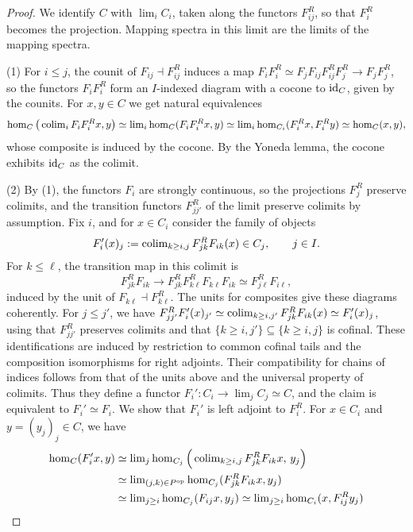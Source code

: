 	\begin{proof}
		We identify $C$ with $\lim_i C_i$, taken along the functors $F_{ij}^R$, so that $F_i^R$ becomes the projection. Mapping spectra in this limit are the limits of the mapping spectra.

		(1) For $i \leq j$, the counit of $F_{ij} \dashv F_{ij}^R$ induces a map $F_iF_i^R \simeq F_jF_{ij}F_{ij}^RF_j^R \to F_jF_j^R$, so the functors $F_iF_i^R$ form an $I$-indexed diagram with a cocone to $\operatorname{id}_C$, given by the counits. For $x,y \in C$ we get natural equivalences
		\[
			\hom_C\big(\operatorname{colim}_i F_iF_i^Rx,y\big) \simeq \operatorname{lim}_i \hom_C(F_iF_i^Rx,y) \simeq \operatorname{lim}_i \hom_{C_i}(F_i^Rx,F_i^Ry) \simeq \hom_C(x,y),
		\]
		whose composite is induced by the cocone. By the Yoneda lemma, the cocone exhibits $\operatorname{id}_C$ as the colimit.

		(2) By (1), the functors $F_i$ are strongly continuous, so the projections $F_j^R$ preserve colimits, and the transition functors $F_{jj'}^R$ of the limit preserve colimits by assumption. Fix $i$, and for $x \in C_i$ consider the family of objects
		\[
			F_i'(x)_j := \operatorname{colim}_{k \geq i,j} F_{jk}^RF_{ik}(x) \in C_j, \qquad j \in I.
		\]
		For $k \leq \ell$, the transition map in this colimit is
		\[
			F_{jk}^RF_{ik} \longrightarrow F_{jk}^RF_{k\ell}^RF_{k\ell}F_{ik} \simeq F_{j\ell}^RF_{i\ell},
		\]
		induced by the unit of $F_{k\ell} \dashv F_{k\ell}^R$. The units for composites give these diagrams coherently. For $j \leq j'$, we have $F_{jj'}^R F_i'(x)_{j'} \simeq \operatorname{colim}_{k \geq i,j'} F_{jk}^RF_{ik}(x) \simeq F_i'(x)_j$, using that $F_{jj'}^R$ preserves colimits and that $\{k \geq i,j'\} \subseteq \{k \geq i,j\}$ is cofinal. These identifications are induced by restriction to common cofinal tails and the composition isomorphisms for right adjoints. Their compatibility for chains of indices follows from that of the units above and the universal property of colimits. Thus they define a functor $F_i'\colon C_i \to \lim_j C_j \simeq C$, and the claim is equivalent to $F_i' \simeq F_i$. We show that $F_i'$ is left adjoint to $F_i^R$. For $x \in C_i$ and $y = (y_j)_j \in C$, we have
		\begin{align*}
			\hom_C(F_i'x,y) &\simeq \lim_j \hom_{C_j}\Big(\colim_{k \geq i,j} F_{jk}^RF_{ik}x,\, y_j\Big) \\
			&\simeq \lim_{(j,k) \in P\catop} \hom_{C_j}(F_{jk}^RF_{ik}x,y_j) \\
			&\simeq \lim_{j \geq i} \hom_{C_j}(F_{ij}x,y_j) \simeq \lim_{j \geq i} \hom_{C_i}(x,F_{ij}^Ry_j) \\

\end{align*}
\end{proof}
